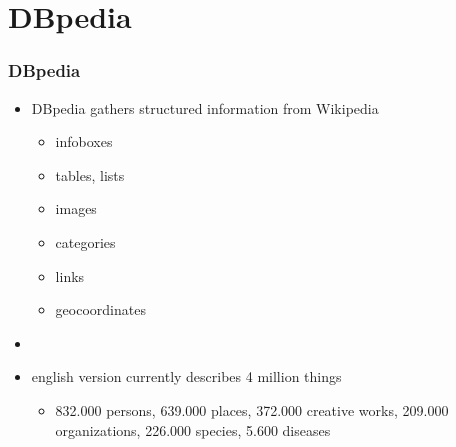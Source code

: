 \section{DBpedia}

\begin{frame}
\frametitle{DBpedia}


\begin{minipage}{0.7\textwidth}
\begin{itemize}
  \item DBpedia gathers structured information from Wikipedia
	\begin{itemize}
	  \item infoboxes
	  \item tables, lists
	  \item images
	  \item categories
	  \item links
	  \item geocoordinates
	\end{itemize}
	\item[]
  \item english version currently describes 4 million things
  \begin{itemize}
    \item 832.000 persons, 639.000 places,
    372.000 creative works, 209.000 organizations, 226.000 species, 5.600
    diseases
    \end{itemize}
\end{itemize}
\end{minipage}
\hfill %
\begin{minipage}{0.25\textwidth}

\end{minipage}
\end{frame}
